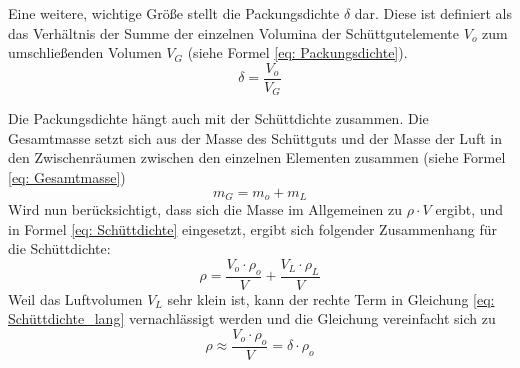 	\noindent
	Eine weitere, wichtige Größe stellt die Packungsdichte $\delta$ dar. Diese ist
	definiert als das Verhältnis der Summe der einzelnen Volumina der
	Schüttgutelemente $V_o$ zum umschließenden Volumen $V_G$ (siehe Formel
	\ref{eq: Packungsdichte}).
	\begin{equation}
		\delta = \frac{V_o}{V_G}
		\label{eq: Packungsdichte}
	\end{equation}

	\noindent
	Die Packungsdichte hängt auch mit der Schüttdichte zusammen. Die Gesamtmasse
	setzt sich aus der Masse des Schüttguts und der Masse der Luft in den
	Zwischenräumen zwischen den einzelnen Elementen zusammen (siehe Formel
	\ref{eq: Gesamtmasse})
	\begin{equation}
		m_G = m_o + m_L
		\label{eq: Gesamtmasse}
	\end{equation}
	\noindent
	Wird nun berücksichtigt, dass sich die Masse im Allgemeinen zu $\rho \cdot V$
	ergibt, und in Formel \ref{eq: Schüttdichte} eingesetzt, ergibt sich folgender
	Zusammenhang für die Schüttdichte:
	\begin{equation}
		\rho = \frac{V_o \cdot \rho_o}{V} + \frac{V_L \cdot \rho_L}{V}
		\label{eq: Schüttdichte_lang}
	\end{equation}
	\noindent
	Weil das Luftvolumen $V_L$ sehr klein ist, kann der rechte Term in Gleichung
	\ref{eq: Schüttdichte_lang} vernachlässigt werden und die Gleichung vereinfacht
	sich zu
	\begin{equation}
		\rho \approx \frac{V_o \cdot \rho_o}{V} = \delta \cdot \rho_o
		\label{eq: Zus_Schüttdichte_Packungsdichte}
	\end{equation}
